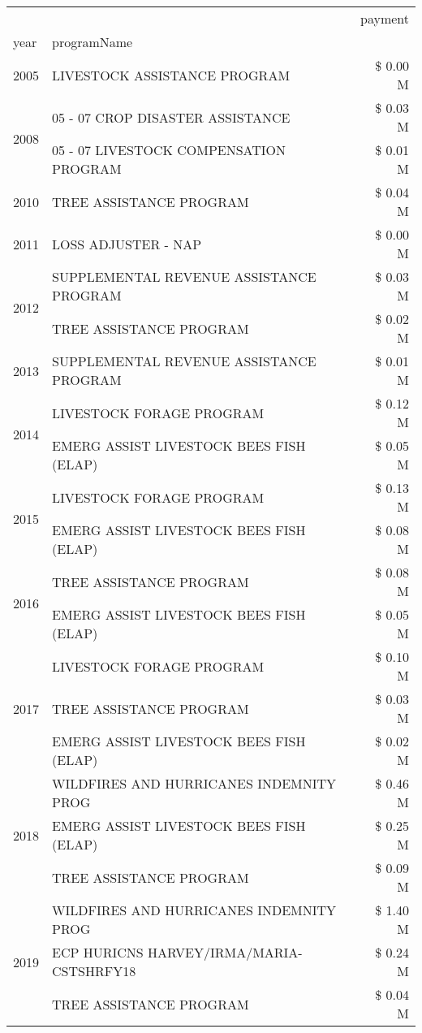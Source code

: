 \begin{tabular}{llr}
\toprule
 &  & payment \\
year & programName &  \\
\midrule
2005 & LIVESTOCK ASSISTANCE PROGRAM & \$ 0.00 M \\
\cline{1-3}
\multirow[t]{2}{*}{2008} & 05 - 07 CROP DISASTER ASSISTANCE & \$ 0.03 M \\
 & 05 - 07 LIVESTOCK COMPENSATION PROGRAM & \$ 0.01 M \\
\cline{1-3}
2010 & TREE ASSISTANCE PROGRAM & \$ 0.04 M \\
\cline{1-3}
2011 & LOSS ADJUSTER - NAP & \$ 0.00 M \\
\cline{1-3}
\multirow[t]{2}{*}{2012} & SUPPLEMENTAL REVENUE ASSISTANCE PROGRAM & \$ 0.03 M \\
 & TREE ASSISTANCE PROGRAM & \$ 0.02 M \\
\cline{1-3}
2013 & SUPPLEMENTAL REVENUE ASSISTANCE PROGRAM & \$ 0.01 M \\
\cline{1-3}
\multirow[t]{2}{*}{2014} & LIVESTOCK FORAGE PROGRAM & \$ 0.12 M \\
 & EMERG ASSIST LIVESTOCK BEES FISH (ELAP) & \$ 0.05 M \\
\cline{1-3}
\multirow[t]{2}{*}{2015} & LIVESTOCK FORAGE PROGRAM & \$ 0.13 M \\
 & EMERG ASSIST LIVESTOCK BEES FISH (ELAP) & \$ 0.08 M \\
\cline{1-3}
\multirow[t]{2}{*}{2016} & TREE ASSISTANCE PROGRAM & \$ 0.08 M \\
 & EMERG ASSIST LIVESTOCK BEES FISH (ELAP) & \$ 0.05 M \\
\cline{1-3}
\multirow[t]{3}{*}{2017} & LIVESTOCK FORAGE PROGRAM & \$ 0.10 M \\
 & TREE ASSISTANCE PROGRAM & \$ 0.03 M \\
 & EMERG ASSIST LIVESTOCK BEES FISH (ELAP) & \$ 0.02 M \\
\cline{1-3}
\multirow[t]{3}{*}{2018} & WILDFIRES AND HURRICANES INDEMNITY PROG & \$ 0.46 M \\
 & EMERG ASSIST LIVESTOCK BEES FISH (ELAP) & \$ 0.25 M \\
 & TREE ASSISTANCE PROGRAM & \$ 0.09 M \\
\cline{1-3}
\multirow[t]{3}{*}{2019} & WILDFIRES AND HURRICANES INDEMNITY PROG & \$ 1.40 M \\
 & ECP HURICNS HARVEY/IRMA/MARIA-CSTSHRFY18 & \$ 0.24 M \\
 & TREE ASSISTANCE PROGRAM & \$ 0.04 M \\

\end{tabular}
